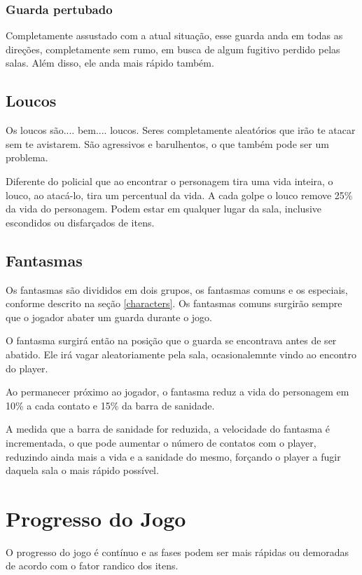 \subsubsection*{Guarda pertubado}

Completamente assustado com a atual situação, esse guarda anda em todas as direções, completamente sem rumo, em busca de algum fugitivo perdido pelas salas. Além disso, ele anda mais rápido também.

\subsection{Loucos}

Os loucos são.... bem.... loucos. Seres completamente aleatórios que irão te atacar sem te avistarem. São agressivos e barulhentos, o que também pode ser um problema. 

Diferente do policial que ao encontrar o personagem tira uma vida inteira, o louco, ao atacá-lo, tira um percentual da vida. A cada golpe o louco remove 25\% da vida do personagem. Podem estar em qualquer lugar da sala, inclusive escondidos ou disfarçados de itens.

\subsection{Fantasmas}
Os fantasmas são divididos em dois grupos, os fantasmas comuns e os especiais, conforme descrito na seção \ref{characters}. Os fantasmas comuns surgirão sempre que o jogador abater um guarda durante o jogo. 

O fantasma surgirá então na posição que o guarda se encontrava antes de ser abatido. Ele irá vagar aleatoriamente pela sala, ocasionalemnte vindo ao encontro do player. 

Ao permanecer próximo ao jogador, o fantasma reduz a vida do personagem em 10\% a cada contato e 15\% da barra de sanidade.

A medida que a barra de sanidade for reduzida, a velocidade do fantasma é incrementada, o que pode aumentar o número de contatos com o player, reduzindo ainda mais a vida e a sanidade do mesmo, forçando o player a fugir daquela sala o mais rápido possível.

\section{Progresso do Jogo}
O progresso do jogo é contínuo e as fases podem ser mais rápidas ou demoradas de acordo com o fator randico dos itens.
